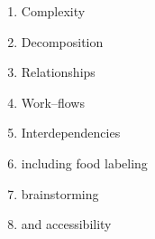 \documentclass[11pt]{article}
\begin{document}
\begin{enumerate}
  \item Complexity~\parencite{suzukiAtelier,KimStoria,yuanAlmost,Yu2016b,
                         Nebeling:2016:WCW:2858036.2858169,Hahn:2016:KAB:2858036.2858364}
  \item Decomposition~\parencite{sensitiveTasks,LykourentzouPersonalityMatters,Law:2016:CKC:2858036.2858144,Chang:2016:ACC:2858036.2858411,Newell:2016:OMA:2858036.2858490}
  \item Relationships~\parencite{turkopticon,storiesIraniSilberman,crowdcollab,takingAHITMcInnis}
  \item Work--flows~\parencite{crowdForgeKittur,bernsteinSoylent,writingMicroTasks,Nebeling:2016:WCW:2858036.2858169}
  \item Interdependencies~\parencite{Bigham2014}
  \item including food labeling~\parencite{noronha2011platemate}
  \item brainstorming~\parencite{siangliulue2015toward,Yu2016a}
  \item and accessibility~\parencite{lasecki2013chorus,lasecki2012real,Lasecki2011}
\end{enumerate}
\printbibliography{}
\end{document}
